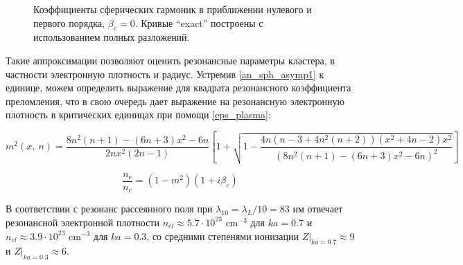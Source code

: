     \begin{figure}[htb]
        \hfil
		\caption{Коэффициенты сферических гармоник в приближении нулевого и первого порядка, $\beta_e = 0$. Кривые ``exact'' построены с использованием полных разложений.}\label{ab_asymp:image}
	\end{figure}


Такие аппроксимации позволяют оценить резонансные параметры кластера, в частности электронную плотность и радиус. Устремив \autoref{an_sph_asymp1} к единице, можем определить выражение для квадрата резонансного коэффициента преломления, что в свою очередь дает выражение на резонансную электронную плотность в критических единицах при помощи \autoref{eps_plasma}:

    \begin{equation}
        m^2 \left(x,\:n \right) = \frac{8n^2 (n + 1) - (6n + 3)x^2 - 6n}{2n x^2 (2n-1)} \left[ 1 + \sqrt{ 1 - \frac{4n (n-3 + 4n^2 (n + 2)) (x^2 + 4n-2) x^2}{{\left(8n^2 (n + 1) - (6n + 3)x^2 - 6n \right)}^{2}} } \right]
        \label{m2_resonance}
    \end{equation}

    \begin{equation}
        \frac{n_e}{n_c} = (1 - m^2) (1 + i \beta_e)
        \label{nenc_resonance}
    \end{equation}


В соответствии с  резонанс рассеянного поля при $\lambda_{10} = \lambda_{L} / 10 = 83$ нм отвечает резонансной электронной плотности $n_{el} \approx 5.7 \cdot 10^{23}$ $\textrm{cm}^{-3}$ для $ka = 0.7$ и $n_{el} \approx 3.9 \cdot 10^{23}$ $\textrm{cm}^{-3}$ для $ka = 0.3$, со средними степенями ионизации $Z|_{ka = 0.7} \approx 9$ и $Z|_{ka = 0.3} \approx 6$.
